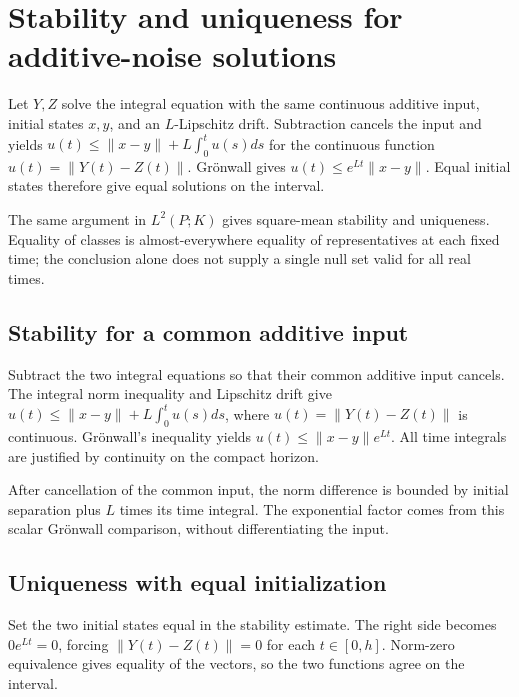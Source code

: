 \documentclass[11pt,a4paper]{report}
\begin{document}
\section{\texorpdfstring{Stability and uniqueness for additive-noise solutions}{Stability and uniqueness for additive-noise solutions}}
\label{proof-module-UnadjustedLangevin-LangevinUniqueness-lean}


Let \(Y,Z\) solve the integral equation with the same continuous additive input, initial states \(x,y\), and an \(L\)-Lipschitz drift. Subtraction cancels the input and yields \(u(t)\le\|x-y\|+L\int_0^tu(s)ds\) for the continuous function \(u(t)=\|Y(t)-Z(t)\|\). Grönwall gives \(u(t)\le e^{Lt}\|x-y\|\). Equal initial states therefore give equal solutions on the interval.



The same argument in \(L^2(P;K)\) gives square-mean stability and uniqueness. Equality of classes is almost-everywhere equality of representatives at each fixed time; the conclusion alone does not supply a single null set valid for all real times.

\subsection{\texorpdfstring{Stability for a common additive input}{Stability for a common additive input}}
\label{report-step-UnadjustedLangevin-LangevinUniqueness-lean-1}


Subtract the two integral equations so that their common additive input cancels. The integral norm inequality and Lipschitz drift give \(u(t)\le\|x-y\|+L\int_0^t u(s)ds\), where \(u(t)=\|Y(t)-Z(t)\|\) is continuous. Grönwall's inequality yields \(u(t)\le\|x-y\|e^{Lt}\). All time integrals are justified by continuity on the compact horizon.



After cancellation of the common input, the norm difference is bounded by initial separation plus \(L\) times its time integral. The exponential factor comes from this scalar Grönwall comparison, without differentiating the input.

\subsection{\texorpdfstring{Uniqueness with equal initialization}{Uniqueness with equal initialization}}
\label{report-step-UnadjustedLangevin-LangevinUniqueness-lean-2}


Set the two initial states equal in the stability estimate. The right side becomes \(0e^{Lt}=0\), forcing \(\|Y(t)-Z(t)\|=0\) for each \(t\in[0,h]\). Norm-zero equivalence gives equality of the vectors, so the two functions agree on the interval.
\end{document}
